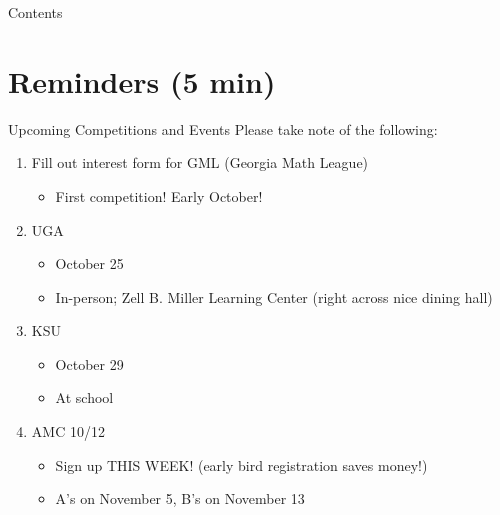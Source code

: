\documentclass[aspectratio=169,xcolor=dvipsnames]{beamer}
\begin{document}
\begin{frame}[t]
  \titlepage
\end{frame}

\begin{frame}[t]{Contents}
  \tableofcontents
\end{frame}


\section{Reminders (5 min)}

\begin{frame}[t]{Upcoming Competitions and Events}
    Please take note of the following:
    \vspace{0.2cm}
    \begin{enumerate}
        \item Fill out interest form for GML (Georgia Math League)  %
        \begin{itemize}
            \item First competition! Early October!
        \end{itemize}
        \item UGA
        \begin{itemize}
            \item October 25
            \item In-person; Zell B. Miller Learning Center (right across nice dining hall)
        \end{itemize}
        \item KSU
        \begin{itemize}
            \item October 29
            \item At school
        \end{itemize}
        \item AMC 10/12
        \begin{itemize}
            \item Sign up THIS WEEK! (early bird registration saves money!)
            \item A's on November 5, B's on November 13
        \end{itemize}
    \end{enumerate}
\end{frame}
\end{document}
